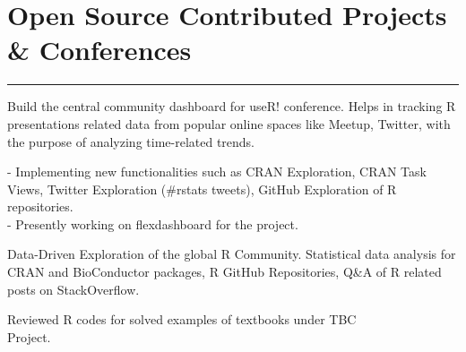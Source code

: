 \documentclass[]{meetresume-class}
\begin{document}
\begin{minipage}[t]{0.66\textwidth}
		\section{Open Source Contributed Projects \& Conferences} 
		\noindent\rule{12.5cm}{0.4pt}
		 
		\descript{}
		\noindent
		\hspace{5em}%
		\begin{minipage}{0.85\textwidth\vspace{2pt}}
			Build the central community dashboard for useR! conference. Helps in tracking R presentations related data from popular online spaces like Meetup, Twitter, with the purpose of analyzing time-related trends.
		\end{minipage}
		\sectionsep
		
		 
		\descript{}
		\noindent
		\hspace{5em}%
		\begin{minipage}{0.85\textwidth\vspace{2pt}}
			 - Implementing new functionalities such as CRAN Exploration, CRAN Task Views, Twitter Exploration (\#rstats tweets), GitHub Exploration of R repositories.\\ 
			 - Presently working on flexdashboard for the project.
		\end{minipage}
		\sectionsep
		
		 
		\descript{}
		\noindent
		\hspace{5em}%
		\begin{minipage}{0.85\textwidth\vspace{2pt}}
			Data-Driven Exploration of the global R Community. Statistical data analysis for
			CRAN and BioConductor packages, R GitHub Repositories, Q\&A of R related
			posts on StackOverflow.
		\end{minipage}
		\sectionsep
		
		 
		\noindent
		\hspace{5em}%
		\begin{minipage}{0.85\textwidth\vspace{2pt}}
			Reviewed R codes for solved examples of textbooks under TBC \\Project. 
		\end{minipage}
		\sectionsep

\end{minipage}
\end{document}
